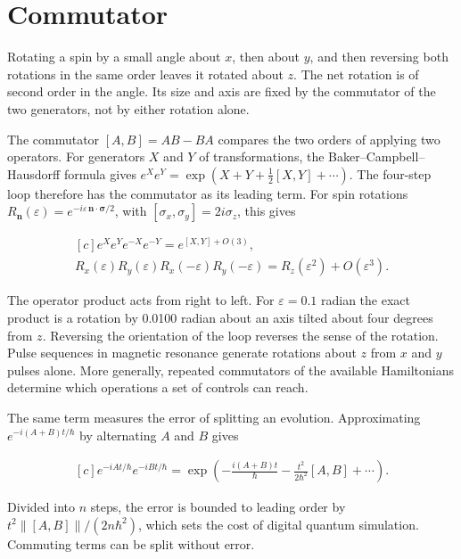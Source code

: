 \documentclass[11pt,oneside]{book}
\newenvironment{centeredalign}{\[\begin{gathered}[c]}{\end{gathered}\]}
\begin{document}
\clearpage

\section{Commutator}

\label{topic:commutator}

Rotating a spin by a small angle about \(x\), then about \(y\), and then reversing both rotations in the same order leaves it rotated about \(z\). The net rotation is of second order in the angle. Its size and axis are fixed by the commutator of the two generators, not by either rotation alone.

The commutator \([A,B]=AB-BA\) compares the two orders of applying two operators. For generators \(X\) and \(Y\) of transformations, the Baker--Campbell--Hausdorff formula gives \(e^Xe^Y=\exp(X+Y+\tfrac12[X,Y]+\cdots)\). The four-step loop therefore has the commutator as its leading term. For spin rotations \(R_{\mathbf n}(\varepsilon)=e^{-i\varepsilon\,\mathbf n\cdot\boldsymbol\sigma/2}\), with \([\sigma_x,\sigma_y]=2i\sigma_z\), this gives

\begin{centeredalign}
e^Xe^Ye^{-X}e^{-Y}=e^{[X,Y]+O(3)},\\
R_x(\varepsilon)R_y(\varepsilon)R_x(-\varepsilon)R_y(-\varepsilon)=R_z(\varepsilon^2)+O(\varepsilon^3).
\end{centeredalign}

The operator product acts from right to left. For \(\varepsilon=0.1\) radian the exact product is a rotation by 0.0100 radian about an axis tilted about four degrees from \(z\). Reversing the orientation of the loop reverses the sense of the rotation. Pulse sequences in magnetic resonance generate rotations about \(z\) from \(x\) and \(y\) pulses alone. More generally, repeated commutators of the available Hamiltonians determine which operations a set of controls can reach.

The same term measures the error of splitting an evolution. Approximating \(e^{-i(A+B)t/\hbar}\) by alternating \(A\) and \(B\) gives

\begin{centeredalign}
e^{-iAt/\hbar}e^{-iBt/\hbar}
=\exp\!\left(-\frac{i(A+B)t}{\hbar}-\frac{t^2}{2\hbar^2}[A,B]+\cdots\right).
\end{centeredalign}

Divided into \(n\) steps, the error is bounded to leading order by \(t^2\|[A,B]\|/(2n\hbar^2)\), which sets the cost of digital quantum simulation. Commuting terms can be split without error.
\end{document}
